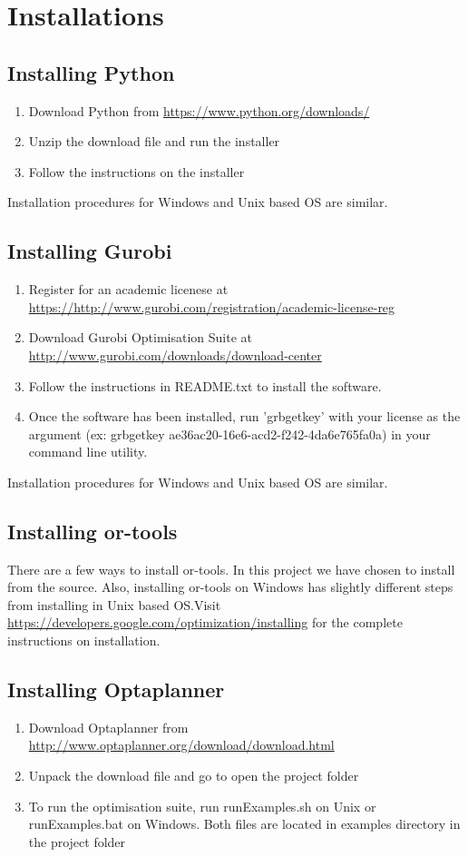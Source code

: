 \chapter{Installations}
\section{Installing Python}
\begin{enumerate}
\item Download Python from \url{https://www.python.org/downloads/}
\item Unzip the download file and run the installer
\item Follow the instructions on the installer
\end{enumerate}
Installation procedures for Windows and Unix based OS are similar.

\section{Installing Gurobi}
\begin{enumerate}
\item Register for an academic licenese at \url{https://http://www.gurobi.com/registration/academic-license-reg}
\item Download Gurobi Optimisation Suite at \url{http://www.gurobi.com/downloads/download-center}
\item Follow the instructions in README.txt to install the software.
\item Once the software has been installed, run 'grbgetkey' with your license as the argument (ex: grbgetkey ae36ac20-16e6-acd2-f242-4da6e765fa0a)
in your command line utility.
\end{enumerate}
Installation procedures for Windows and Unix based OS are similar.

\section{Installing or-tools}
There are a few ways to install or-tools. In this project we have chosen to install from the source. Also, installing
or-tools on Windows has slightly different steps from installing in Unix based OS.Visit
\url{https://developers.google.com/optimization/installing} for the complete instructions on installation.

\section{Installing Optaplanner}
\begin{enumerate}
\item Download Optaplanner from \url{http://www.optaplanner.org/download/download.html}
\item Unpack the download file and go to open the project folder
\item To run the optimisation suite, run runExamples.sh on Unix or runExamples.bat on Windows. Both files are located
in examples directory in the project folder
\end{enumerate}

